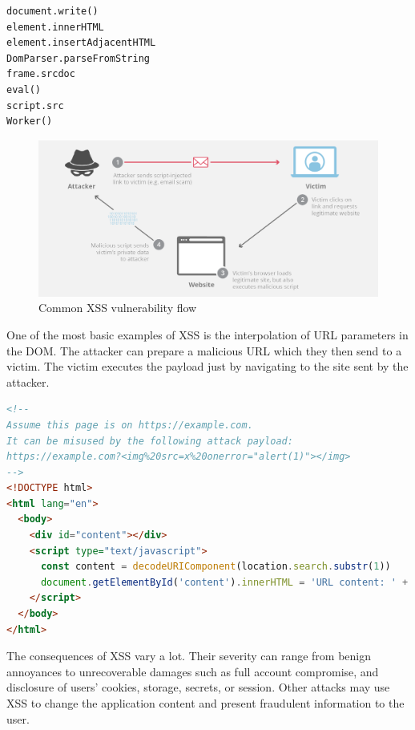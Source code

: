 \bigskip
\begin{lstlisting}[language={}, caption=Common DOM XSS sinks \cite{dom_xss_portswigger} \cite{tt_web_framework_paper}]
document.write()
element.innerHTML
element.insertAdjacentHTML
DomParser.parseFromString
frame.srcdoc
eval()
script.src
Worker()
\end{lstlisting}

\begin{figure}[H]
  \centerline{\includegraphics[width=1\textwidth]{images/xss-attack.png}}
  \caption[Common XSS vulnerability flow \cite{xss_image}]{Common XSS vulnerability flow \cite{xss_image}}
  \label{img:xss}
\end{figure}

One of the most basic examples of XSS is the interpolation of URL parameters in the DOM. The
attacker can prepare a malicious URL which they then send to a victim. The victim executes the
payload just by navigating to the site sent by the attacker.

\vspace{60mm}

\bigskip
\begin{lstlisting}[language=HTML, caption=Basic example of XSS via unsafe URL parameter interpolation]
<!--
Assume this page is on https://example.com.
It can be misused by the following attack payload:
https://example.com?<img%20src=x%20onerror="alert(1)"></img>
-->
<!DOCTYPE html>
<html lang="en">
  <body>
    <div id="content"></div>
    <script type="text/javascript">
      const content = decodeURIComponent(location.search.substr(1))
      document.getElementById('content').innerHTML = 'URL content: ' + content
    </script>
  </body>
</html>
\end{lstlisting}

The consequences of XSS vary a lot. Their severity can range from benign annoyances to unrecoverable
damages such as full account compromise, and disclosure of users' cookies, storage, secrets, or
session. Other attacks may use XSS to change the application content and present fraudulent
information to the user.

